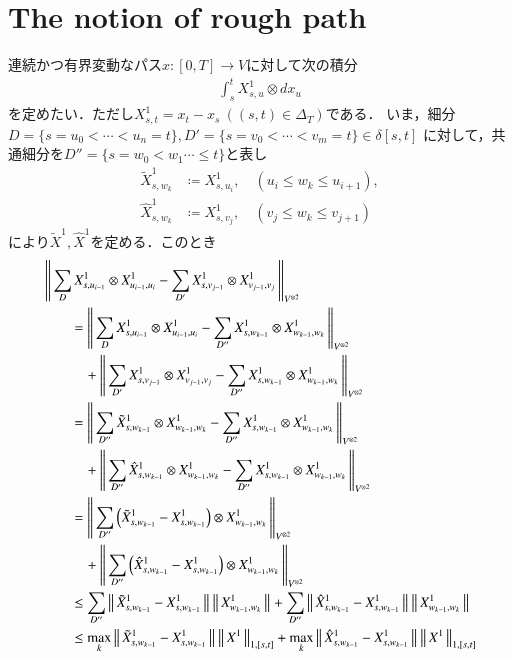 \section{The notion of rough path}
	連続かつ有界変動なパス$x:[0,T] \longrightarrow V$に対して次の積分
	\begin{align}
		\int_s^t X^1_{s,u} \otimes d x_u
	\end{align}
	を定めたい．ただし$X^1_{s,t} = x_t - x_s\ ((s,t) \in \Delta_T)$である．
	いま，細分$D=\{s=u_0 < \cdots <u_n= t\},D'=\{s=v_0 < \cdots <v_m= t\} \in \delta[s,t]$
	に対して，共通細分を$D''=\{s=w_0 < w_1 \cdots \leq t\}$と表し
	\begin{align}
		\tilde{X}^1_{s,w_k} &\coloneqq X^1_{s,u_i},
		\quad (u_i \leq w_k \leq u_{i+1}), \\
		\hat{X}^1_{s,w_k} &\coloneqq X^1_{s,v_j},
		\quad (v_j \leq w_k \leq v_{j+1})
	\end{align}
	により$\tilde{X}^1,\hat{X}^1$を定める．このとき
	\begin{align}
		&\left\|\,  \sum_D X^1_{s,u_{i-1}} \otimes X^1_{u_{i-1},u_i} - 
			\sum_{D'} X^1_{s,v_{j-1}} \otimes X^1_{v_{j-1},v_j}\, \right\|_{V^{\otimes 2}} \\
		&\qquad= \left\|\,  \sum_D X^1_{s,u_{i-1}} \otimes X^1_{u_{i-1},u_i} - 
			\sum_{D''} X^1_{s,w_{k-1}} \otimes X^1_{w_{k-1},w_k}\, \right\|_{V^{\otimes 2}} \\
			&\quad\qquad + \left\|\,  \sum_{D'} X^1_{s,v_{j-1}} \otimes X^1_{v_{j-1},v_j} - 
			\sum_{D''} X^1_{s,w_{k-1}} \otimes X^1_{w_{k-1},w_k}\, \right\|_{V^{\otimes 2}} \\
		&\qquad= \left\|\,  \sum_{D''} \tilde{X}^1_{s,w_{k-1}} \otimes X^1_{w_{k-1},w_k} - 
			\sum_{D''} X^1_{s,w_{k-1}} \otimes X^1_{w_{k-1},w_k}\, \right\|_{V^{\otimes 2}} \\
			&\quad\qquad + \left\|\,  \sum_{D''} \hat{X}^1_{s,w_{k-1}} \otimes X^1_{w_{k-1},w_k} - 
			\sum_{D''} X^1_{s,w_{k-1}} \otimes X^1_{w_{k-1},w_k}\, \right\|_{V^{\otimes 2}} \\
		&\qquad= \left\|\,  \sum_{D''} \left(\tilde{X}^1_{s,w_{k-1}} -  X^1_{s,w_{k-1}} \right)
		 	\otimes X^1_{w_{k-1},w_k}\, \right\|_{V^{\otimes 2}} \\
			&\quad\qquad + \left\|\,  \sum_{D''} \left( \hat{X}^1_{s,w_{k-1}} - X^1_{s,w_{k-1}} \right)
			 \otimes X^1_{w_{k-1},w_k}\, \right\|_{V^{\otimes 2}} \\
		&\qquad \leq \sum_{D''} \left\|\, \tilde{X}^1_{s,w_{k-1}} -  X^1_{s,w_{k-1}}\, \right\|_{} \left\|\, X^1_{w_{k-1},w_k}\, \right\|_{}
			+ \sum_{D''} \left\|\, \hat{X}^1_{s,w_{k-1}} -  X^1_{s,w_{k-1}}\, \right\|_{} \left\|\, X^1_{w_{k-1},w_k}\, \right\|_{} \\
		&\qquad \leq \operatorname*{max}_{k} \left\|\, \tilde{X}^1_{s,w_{k-1}} -  X^1_{s,w_{k-1}}\, \right\|_{} 
			\left\|\, X^1\, \right\|_{1,[s,t]} + \operatorname*{max}_{k} \left\|\, \hat{X}^1_{s,w_{k-1}} -  X^1_{s,w_{k-1}}\, \right\|_{} 
			\left\|\, X^1\, \right\|_{1,[s,t]}
	\end{align}
